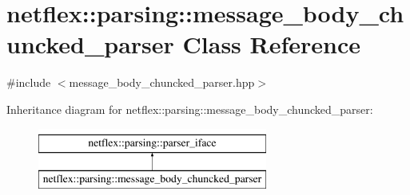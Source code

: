 \hypertarget{classnetflex_1_1parsing_1_1message__body__chuncked__parser}{}\section{netflex\+:\+:parsing\+:\+:message\+\_\+body\+\_\+chuncked\+\_\+parser Class Reference}
\label{classnetflex_1_1parsing_1_1message__body__chuncked__parser}


{\ttfamily \#include $<$message\+\_\+body\+\_\+chuncked\+\_\+parser.\+hpp$>$}

Inheritance diagram for netflex\+:\+:parsing\+:\+:message\+\_\+body\+\_\+chuncked\+\_\+parser\+:\begin{figure}[H]
\begin{center}
\leavevmode
\includegraphics[height=2.000000cm]{classnetflex_1_1parsing_1_1message__body__chuncked__parser}
\end{center}
\end{figure}
